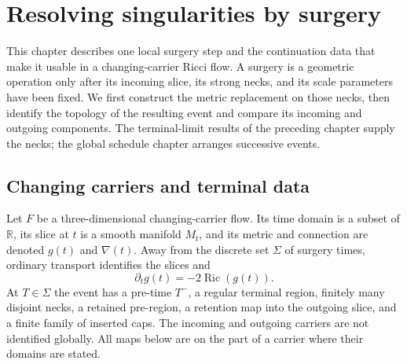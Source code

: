 \chapter{Resolving singularities by surgery}
\label{ch:surgery}

This chapter describes one local surgery step and the continuation data that
make it usable in a changing-carrier Ricci flow.  A surgery is a geometric
operation only after its incoming slice, its strong necks, and its scale
parameters have been fixed.  We first construct the metric replacement on
those necks, then identify the topology of the resulting event and compare
its incoming and outgoing components.  The terminal-limit results of the
preceding chapter supply the necks; the global schedule chapter arranges
successive events.

\section{Changing carriers and terminal data}
\label{sec:surgery-carriers}

Let $F$ be a three-dimensional changing-carrier flow.  Its time domain is a
subset of $\mathbb R$, its slice at $t$ is a smooth manifold $M_t$, and its
metric and connection are denoted $g(t)$ and $\nabla(t)$.  Away from the
discrete set $\Sigma$ of surgery times, ordinary transport identifies the
slices and
\[
        \partial_t g(t)=-2\operatorname{Ric}(g(t)).
\]
At $T\in\Sigma$ the event has a pre-time $T^-$, a regular terminal region,
finitely many disjoint necks, a retained pre-region, a retention map into the
outgoing slice, and a finite family of inserted caps.  The incoming and
outgoing carriers are not identified globally.  All maps below are on the
part of a carrier where their domains are stated.

